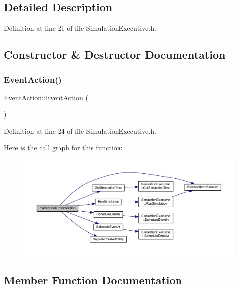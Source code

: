 \subsection{Detailed Description}


Definition at line 21 of file Simulation\+Executive.\+h.



\subsection{Constructor \& Destructor Documentation}
\mbox{\label{class_event_action_a9a8515b9069293b94b72a6863c48e6ba}} 
\subsubsection{\texorpdfstring{Event\+Action()}{EventAction()}}
{\footnotesize\ttfamily Event\+Action\+::\+Event\+Action (\begin{DoxyParamCaption}{ }\end{DoxyParamCaption})\hspace{0.3cm}{\ttfamily [inline]}}



Definition at line 24 of file Simulation\+Executive.\+h.

Here is the call graph for this function\+:\nopagebreak
\begin{figure}[H]
\begin{center}
\leavevmode
\includegraphics[width=350pt]{class_event_action_a9a8515b9069293b94b72a6863c48e6ba_cgraph}
\end{center}
\end{figure}


\subsection{Member Function Documentation}
\mbox{\label{class_event_action_a62b9d07abb4ca8e7c078b076a1ab1a9f}} 

